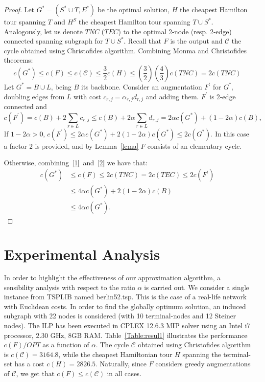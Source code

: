 \documentclass{endm}
\begin{document}
\begin{proof}
Let $G^*=(S^* \cup T,E^*)$ be the optimal solution, $H$ the cheapest Hamilton tour spanning $T$  and $H^S$ the cheapest Hamilton tour spanning $T\cup S^*$.
Analogously, let us denote $TNC$ ($TEC$) to the optimal 2-node (resp. 2-edge) connected spanning subgraph for $T\cup S^{*}$. Recall that $F$ is the output and $\mathcal{C}$ the cycle obtained
using Christofides algorithm. Combining Monma and Christofides theorems:
\begin{equation}\label{1}
c(G^{*}) \leq c(F) \leq c(\mathcal{C})\leq \frac{3}{2}c(H)
                   \leq \left(\frac{3}{2}\right) \left(\frac{4}{3}\right) c(TNC) = 2 c(TNC)
\end{equation}
Let $G^{*}=B \cup L$, being $B$ its backbone. Consider an augmentation $F^{\prime}$ for $G^{*}$, doubling edges from $L$
with cost $c_{r,j}=\alpha_{r,j} d_{r,j}$ and adding them. $F^{\prime}$ is 2-edge connected and
\begin{equation}\label{2}
c(F^{\prime}) = c(B)+2\sum_{r\in L}c_{r,j} \leq c(B)+2\alpha \sum_{r\in L}d_{r,j} =2 \alpha c(G^{*})+(1- 2 \alpha)c(B),
\end{equation}
\indent If $1-2 \alpha > 0$, $c(F^{\prime}) \leq 2 \alpha c(G^{*})+ 2(1-2 \alpha )c(G^{*})\leq 2 c(G^{*})$.
In this case a factor 2 is provided, and by Lemma~\ref{lema} $F$ consists of an elementary cycle.

\indent Otherwise, combining~\eqref{1}~and~\eqref{2} we have that:
\begin{align*}
  c(G^{*}) & \leq c(F) \leq 2 c(TNC) = 2 c(TEC) \leq 2 c(F^{\prime}) \\
           & \leq 4 \alpha c(G^{*})+ 2(1-2 \alpha)c(B)\\
           &\leq 4\alpha c(G^{*}).
\end{align*}
\end{proof}

\clearpage
\section{Experimental Analysis}\label{Comparison}
In order to highlight the effectiveness of our approximation algorithm, a sensibility
analysis with respect to the ratio $\alpha$ is carried out. We consider a single
instance from TSPLIB named berlin52.tsp. This is the case of a real-life network
with Euclidean costs. In order to find the globally optimum solution, an
induced subgraph with 22 nodes is considered (with 10  terminal-nodes and 12 Steiner nodes).
The ILP has been executed in CPLEX 12.6.3 MIP solver using an Intel i7 processor, 2.30 GHz, 8GB RAM.
Table~\ref{Table:resul1} illustrates the performance $c(F)/OPT$ as a function
of $\alpha$. The cycle $\mathcal{C}$ obtained using Christofides algorithm is
$c(\mathcal{C})=3164.8$, while the cheapest Hamiltonian tour $H$ spanning the terminal-set
has a cost $c(H)=2826.5$. Naturally, since $F$ considers greedy augmentations of
$\mathcal{C}$, we get that $c(F)\leq c(\mathcal{C})$ in all cases.
\end{document}

